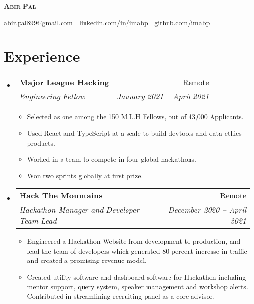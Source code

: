 \documentclass[letterpaper,11pt]{article}
\makeatletter
\newcommand{\resumeItem}[1]{
  \item\small{
    {#1 \vspace{-2pt}}
  }
}
\newcommand{\resumeSubheading}[4]{
  \vspace{-2pt}\item
    \begin{tabular*}{0.97\textwidth}[t]{l@{\extracolsep{\fill}}r}
      \textbf{#1} & #2 \\
      \textit{\small#3} & \textit{\small #4} \\
    \end{tabular*}\vspace{-7pt}
}
\newcommand{\resumeSubSubheading}[2]{
    \item
    \begin{tabular*}{0.97\textwidth}{l@{\extracolsep{\fill}}r}
      \textit{\small#1} & \textit{\small #2} \\
    \end{tabular*}\vspace{-7pt}
}
\newcommand{\resumeSubHeadingListStart}{\begin{itemize}[leftmargin=0.15in, label={}]}
\newcommand{\resumeSubHeadingListEnd}{\end{itemize}}
\newcommand{\resumeItemListStart}{\begin{itemize}}
\newcommand{\resumeItemListEnd}{\end{itemize}\vspace{-5pt}}
\makeatother
\begin{document}

\begin{center}
    \textbf{\Huge \scshape Abir Pal} \\ \vspace{1pt}
   
    \href{mailto:abir.pal899@gmail.com}{\underline{abir.pal899@gmail.com}} $|$ 
    \href{https://linkedin.com/in/imabp}{\underline{linkedin.com/in/imabp}} $|$
    \href{https://github.com/imabp}{\underline{github.com/imabp}}
\end{center}


\section{Experience}
  \resumeSubHeadingListStart

    \resumeSubheading
      {Major League Hacking}{Remote}
      {Engineering Fellow}{January 2021 -- April 2021}
      \resumeItemListStart
        \resumeItem{Selected as one among the 150 M.L.H Fellows, out of 43,000 Applicants. }
         \resumeItem{Used React and TypeScript at a scale to build devtools and data ethics products.}
         \resumeItem{Worked in a team to compete in four global hackathons.}
         \resumeItem{Won two sprints globally at first prize.}
     \resumeItemListEnd

    \resumeSubheading
      {Hack The Mountains}{Remote}
      {Hackathon Manager and Developer Team Lead}{December 2020 -- April 2021}
      \resumeItemListStart
        \resumeItem{Engineered a Hackathon Website from development to production, and lead the team of developers which generated 80 percent increase in traffic and created a promising revenue model.}
        \resumeItem{Created utility software and dashboard software for Hackathon including mentor support, query system, speaker management and workshop alerts. Contributed in streamlining recruiting panel as a core advisor.}
        
    
      \resumeItemListEnd
  \resumeSubHeadingListEnd


\end{document}
